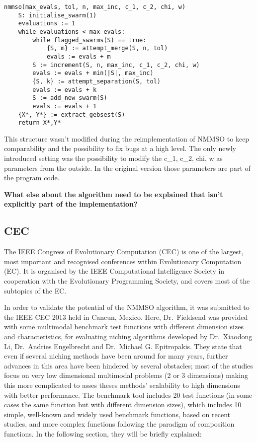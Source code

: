 \documentclass[12pt,a4paper]{article}
\begin{document}
\begin{verbatim}
nmmso(max_evals, tol, n, max_inc, c_1, c_2, chi, w)
    S: initialise_swarm(1)
    evaluations := 1
    while evaluations < max_evals:
        while flagged_swarms(S) == true:
            {S, m} := attempt_merge(S, n, tol)
            evals := evals + m
        S := increment(S, n, max_inc, c_1, c_2, chi, w)
        evals := evals + min(|S|, max_inc)
        {S, k} := attempt_separation(S, tol)
        evals := evals + k
        S := add_new_swarm(S)
        evals := evals + 1
    {X*, Y*} := extract_gebsest(S)
    return X*,Y*
\end{verbatim}

This structure wasn't modified during the reimplementation of NMMSO to
keep comparability and the possibility to fix bugs at a high level. The
only newly introduced setting was the possibility to modify the c\_1,
c\_2, chi, w as parameters from the outside. In the original version
those parameters are part of the program code.

\textbf{What else about the algorithm need to be explained that isn't
explicitly part of the implementation?}

\subsection{CEC}\label{cec}

The IEEE Congress of Evolutionary Computation (CEC) is one of the
largest, most important and recognised conferences within Evolutionary
Computation (EC). It is organised by the IEEE Computational Intelligence
Society in cooperation with the Evolutionary Programming Society, and
covers most of the subtopics of the EC.

In order to validate the potential of the NMMSO algorithm, it was
submitted to the IEEE CEC 2013 held in Cancun, Mexico. Here,
Dr.~Fieldsend was provided with some multimodal benchmark test functions
with different dimension sizes and characteristics, for evaluating
niching algorithms developed by Dr.~Xiaodong Li, Dr.~Andries Engelbrecht
and Dr.~Michael G. Epitropakis. They state that even if several niching
methods have been around for many years, further advances in this area
have been hindered by several obstacles; most of the studies focus on
very low dimensional multimodal problems (2 or 3 dimensions) making this
more complicated to asses theses methods' scalability to high dimensions
with better performance. The benchmark tool includes 20 test functions
(in some cases the same function but with different dimension sizes),
which includes 10 simple, well-known and widely used benchmark
functions, based on recent studies, and more complex functions following
the paradigm of composition functions. In the following section, they
will be briefly explained:
\end{document}
